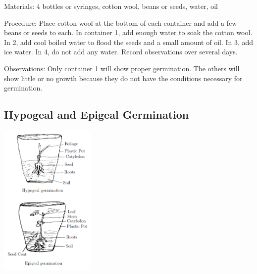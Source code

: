 \begin{multicols}{2}
\begin{description*}
\item[Materials:]{4 bottles or syringes, cotton wool, beans or seeds, water, oil}
\item[Procedure:]{Place cotton wool at the bottom of each container and add a few beans or seeds to each. In container 1, add enough water to soak the cotton wool. In 2, add cool boiled water to flood the seeds and a small amount of oil. In 3, add ice water. In 4, do not add any water. Record observations over several days.}
\item[Observations:]{Only container 1 will show proper germination. The others will
show little or no growth because they do not have the conditions necessary
for germination.}
\end{description*}

\subsection{Hypogeal and Epigeal Germination}

\begin{center}
\includegraphics[width=0.35\textwidth]{./img/germination-hyp-ep.png}
\end{center}


\end{multicols}
